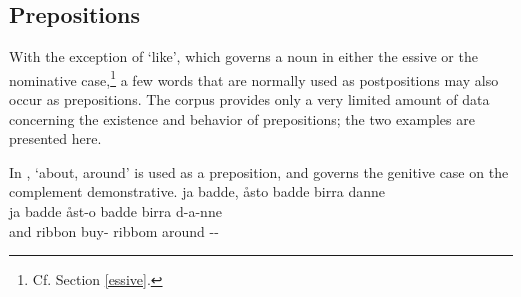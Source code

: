 \subsection{Prepositions}\label{prepositions}
With the exception of  ‘like’, which governs a noun in either the essive or the nominative case,\footnote{Cf. Section \ref{essive}.} 
a few words that are normally used as postpositions may also occur as prepositions. 
The corpus provides only a very limited amount of data concerning the existence and behavior of prepositions; the two examples are presented here. 

In ,  ‘about, around’ is used as a preposition, and governs the genitive case on the complement demonstrative. 
\ea\label{prepositionEx1}%
\glll	ja badde, åsto badde birra danne\\
	ja badde åst-o badde birra d-a-nne\\
	and ribbon\BS{} buy-\BS{} ribbom\BS{} around --\\\nopagebreak
{}	
\z


